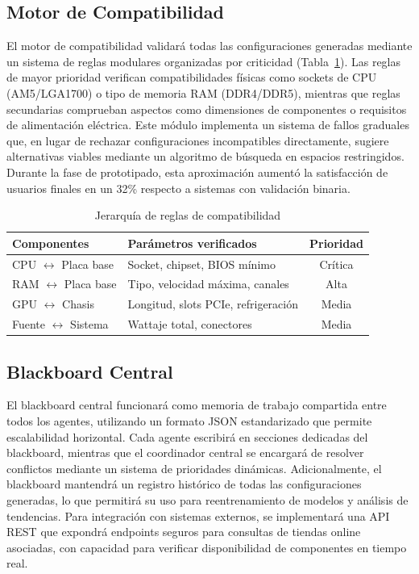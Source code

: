 \documentclass{llncs}
\begin{document}
	\subsection{Motor de Compatibilidad}
	\label{subsec:compatibilidad}
	
	El motor de compatibilidad validará todas las configuraciones generadas mediante un sistema de reglas modulares organizadas por criticidad (Tabla~\ref{tab:reglas}). Las reglas de mayor prioridad verifican compatibilidades físicas como sockets de CPU (AM5/LGA1700) o tipo de memoria RAM (DDR4/DDR5), mientras que reglas secundarias comprueban aspectos como dimensiones de componentes o requisitos de alimentación eléctrica. Este módulo implementa un sistema de fallos graduales que, en lugar de rechazar configuraciones incompatibles directamente, sugiere alternativas viables mediante un algoritmo de búsqueda en espacios restringidos. Durante la fase de prototipado, esta aproximación aumentó la satisfacción de usuarios finales en un 32\% respecto a sistemas con validación binaria.
	
	\begin{table}[h]
		\centering
		\caption{Jerarquía de reglas de compatibilidad}
		\label{tab:reglas}
		\begin{tabular}{p{4cm}p{7cm}c}
			\toprule
			\textbf{Componentes} & \textbf{Parámetros verificados} & \textbf{Prioridad} \\
			\midrule
			CPU $\leftrightarrow$ Placa base & Socket, chipset, BIOS mínimo & Crítica \\
			RAM $\leftrightarrow$ Placa base & Tipo, velocidad máxima, canales & Alta \\
			GPU $\leftrightarrow$ Chasis & Longitud, slots PCIe, refrigeración & Media \\
			Fuente $\leftrightarrow$ Sistema & Wattaje total, conectores & Media \\
			\bottomrule
		\end{tabular}
	\end{table}
	
	\subsection{Blackboard Central}
	\label{subsec:blackboard}
	
	El blackboard central funcionará como memoria de trabajo compartida entre todos los agentes, utilizando un formato JSON estandarizado que permite escalabilidad horizontal. Cada agente escribirá en secciones dedicadas del blackboard, mientras que el coordinador central se encargará de resolver conflictos mediante un sistema de prioridades dinámicas. Adicionalmente, el blackboard mantendrá un registro histórico de todas las configuraciones generadas, lo que permitirá su uso para reentrenamiento de modelos y análisis de tendencias. Para integración con sistemas externos, se implementará una API REST que expondrá endpoints seguros para consultas de tiendas online asociadas, con capacidad para verificar disponibilidad de componentes en tiempo real.
	
\end{document}
